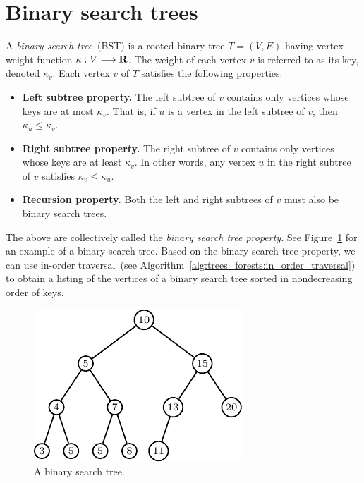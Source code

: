 
\section{Binary search trees}
\label{sec:tree_data_structures:binary_search_trees}

A \emph{binary search tree}~(BST)
is a rooted binary tree $T = (V,E)$ having vertex weight function
$\kappa: V \longrightarrow \mathbf{R}$. The weight of each vertex $v$ is referred to as
its key, denoted $\kappa_v$. Each vertex $v$ of $T$ satisfies the
following properties:
\begin{itemize}
\item \textbf{Left subtree property.}
  The left subtree of $v$ contains only vertices whose keys are at
  most $\kappa_v$. That is, if $u$ is a vertex in the left subtree of
  $v$, then $\kappa_u \leq \kappa_v$.

\item \textbf{Right subtree property.}
  The right subtree of $v$ contains only vertices whose keys are at
  least $\kappa_v$. In other words, any vertex $u$ in the right
  subtree of $v$ satisfies $\kappa_v \leq \kappa_u$.

\item \textbf{Recursion property.}
  Both the left and right subtrees of $v$ must also be binary search
  trees.
\end{itemize}
The above are collectively called the
\emph{binary search tree property}.
See Figure~\ref{fig:tree_data_structures:binary_search_tree} for an
example of a binary search tree. Based on the binary search tree
property, we can use in-order traversal~(see
Algorithm~\ref{alg:trees_forests:in_order_traversal}) to obtain a
listing of the vertices of a binary search tree sorted in
nondecreasing order of keys.

\begin{figure}[!htbp]
\centering
{}
\includegraphics{image/tree-data-structures/binary-search-tree-examples}
\caption{A binary search tree.}
\label{fig:tree_data_structures:binary_search_tree}
\end{figure}


